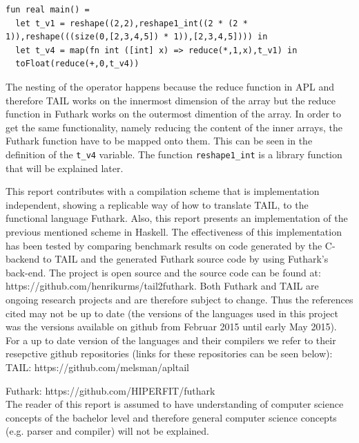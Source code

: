 \documentclass[11pt]{article}
\begin{document}
\begin{lstlisting}[numbers=none,frame=none,breaklines=true,language=Futhark]
fun real main() =
  let t_v1 = reshape((2,2),reshape1_int((2 * (2 * 1)),reshape(((size(0,[2,3,4,5]) * 1)),[2,3,4,5]))) in
  let t_v4 = map(fn int ([int] x) => reduce(*,1,x),t_v1) in
  toFloat(reduce(+,0,t_v4))
\end{lstlisting}

The nesting of the operator happens because the reduce function in APL and therefore TAIL works on the innermost dimension of the array but the reduce function in Futhark works on the outermost dimention of the array. In order to get the same functionality, namely reducing the content of the inner arrays, the Futhark function have to be mapped onto them. This can be seen in the definition of the {\tt t\_v4} variable. 
The function {\tt reshape1\_int} is a library function that will be explained later. 

This report contributes with a compilation scheme that is implementation independent, showing a replicable 
way of how to translate TAIL, to the functional language Futhark. Also, 
this report presents an implementation of the previous mentioned scheme in Haskell.
The effectiveness of this implementation has been tested by comparing benchmark results on code generated by the C-backend to TAIL 
and the generated Futhark source code by using Futhark's back-end.
The project is open source and the source code can be found at:\\ https://github.com/henrikurms/tail2futhark.
Both Futhark and TAIL are ongoing research projects and are therefore subject to change. Thus the references cited may not be up to date (the versions of the languages used in this project was the versions available on github from Februar 2015 until early May 2015). For a up to date version of the languages and their compilers we refer to their resepctive github repositories (links for these repositories can be seen below): \\

TAIL: https://github.com/melsman/apltail

Futhark: https://github.com/HIPERFIT/futhark\\

The reader of this report is assumed to have understanding of computer science concepts of the bachelor level and therefore general computer science concepts (e.g. parser and compiler) will not be explained. 
\end{document}
